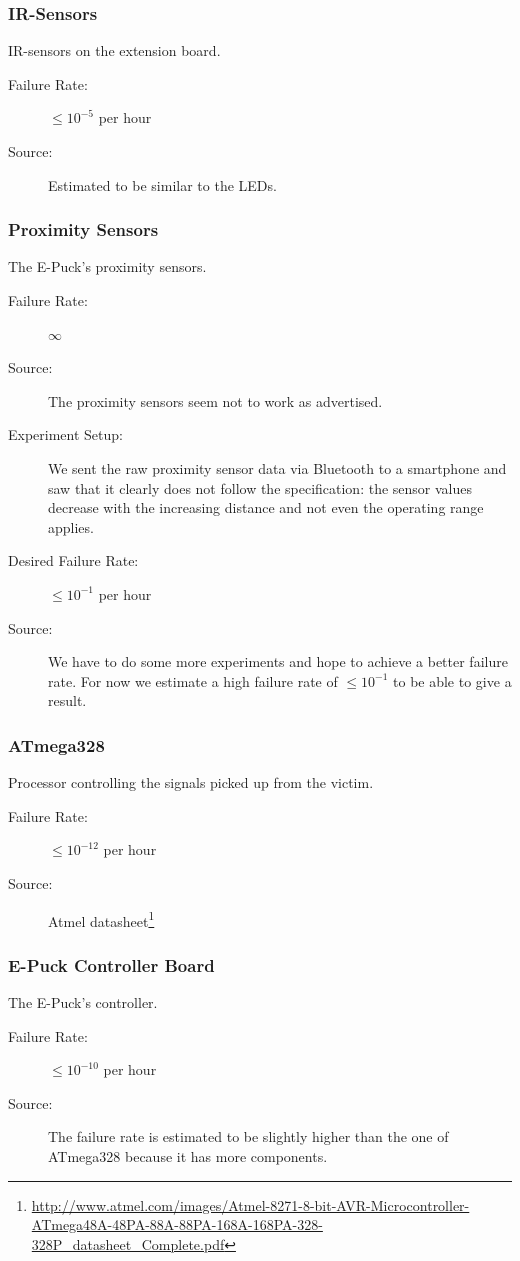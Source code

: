 \documentclass[a4paper,parskip,headheight=38pt]{scrartcl} %
\begin{document}
\subsubsection{IR-Sensors}
IR-sensors on the extension board.
\begin{description}
	\item[Failure Rate:] $\leq 10^{-5}$ per hour
	\item[Source:] Estimated to be similar to the LEDs.
\end{description}

\subsubsection{Proximity Sensors}
The E-Puck's proximity sensors.
\begin{description}
	\item[Failure Rate:] $\infty$
	\item[Source:] The proximity sensors seem not to work as advertised.
	\item[Experiment Setup:] We sent the raw proximity sensor data via Bluetooth to a smartphone and saw that it clearly does not follow the specification: the sensor values decrease with the increasing distance and not even the operating range applies.
	\item[Desired Failure Rate:] $\leq 10^{-1}$ per hour
	\item[Source:] We have to do some more experiments and hope to achieve a better failure rate. For now we estimate a high failure rate of $\leq 10^{-1}$ to be able to give a result.
\end{description}

\subsubsection{ATmega328}
Processor controlling the signals picked up from the victim.
\begin{description}
	\item[Failure Rate:] $\leq 10^{-12}$ per hour
	\item[Source:] Atmel datasheet\footnote{\url{http://www.atmel.com/images/Atmel-8271-8-bit-AVR-Microcontroller-ATmega48A-48PA-88A-88PA-168A-168PA-328-328P\_datasheet\_Complete.pdf}}
\end{description}

\subsubsection{E-Puck Controller Board}
The E-Puck's controller.
\begin{description}
	\item[Failure Rate:] $\leq 10^{-10}$ per hour
	\item[Source:] The failure rate is estimated to be slightly higher than the one of ATmega328 because it has more components.
\end{description}
\end{document}
